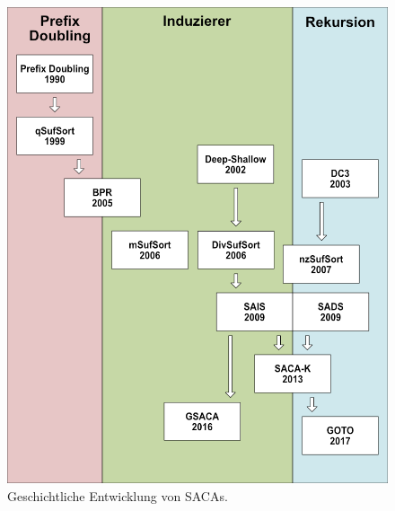 \begin{figure}[H]
	\centering
	\includegraphics[width=\linewidth]{kapitel/5_saca_uebersicht/history/history2}
	\caption[Geschichtliche Entwicklung von SACAs.]{Geschichtliche Entwicklung von SACAs.}
	\label{fig_banane_1_2}
\end{figure}
